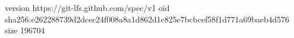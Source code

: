 version https://git-lfs.github.com/spec/v1
oid sha256:e262288739d2dcec24f008a8a1d862d1c825e7bcbcef58f1d771a69baeb4d576
size 196704
